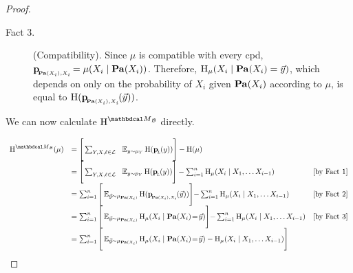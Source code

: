 \begin{proof}
\begin{description}
\item[Fact 3.] (Compatibility). Since $\mu$ is
					  compatible with every cpd,
					  $\bp[\Pa(X_i),X_i] = \mu(X_i \mid
					  \Pa(X_i))$. Therefore, $\H_\mu(X_i \mid
					  \Pa(X_i) = \vec y) $, which depends on only
					  on the probability of $X_i$ given $\Pa(X_i)$
					  according to $\mu$, is equal to
					  $\H(\bp[\Pa(X_i),X_i](\vec y))$.  
	\end{description}
					We can now calculate $\H^{\PDGof{\cal B}}$ directly.
	
	

\begin{equation}\label{eqn:maxentsum} 
			\begin{array}{lll}
		\H^{\PDGof{\mathcal B}}(\mu) &=
					\Bigg[\sum_{Y,X, \ell \in \cal L} ~~\E_{y \sim
						\mu_Y}  \H (\bp (y)) \Bigg] - \H(\mu) \\ 
		&= {\Bigg[\sum_{Y,X, \ell \in \cal L} ~~\E_{y
						  \sim p_Y}  \H (\bp (y)) \Bigg]} -
					\sum_{i = 1}^n \H_\mu(X_i \mid X_1, \ldots
											X_{i-1}) & \text{[by
												Fact 1]} \\  
		&= \sum_{i = 1}^n  \Bigg[ \E_{\vec y \sim
												\mu_{\Pa(X_i)}} \H
											  (\bp[\Pa(X_i), X_i]
											  (\vec y)) \Bigg] { -
											  \sum_{i = 1}^n
											  \H_\mu(X_i \mid X_1,
											  \ldots X_{i-1})} &
											\text{[by Fact 2]} \\ 
								&= \sum_{i = 1}^n  \Bigg[ \E_{\vec y \sim \mu_{\Pa(X_i)}}  \H_\mu (X_i \mid \Pa(X_i) \!=\! \vec y) \Bigg] 
		{ - \sum_{i = 1}^n \H_\mu(X_i \mid X_1, \ldots
					  X_{i-1})} & \text{[by Fact 3]} \\ 
		  &= \sum_{i = 1}^n  \Bigg[ \E_{\vec y \sim
						\mu_{\Pa(X_i)}} \H_\mu (X_i \mid \Pa(X_i)
					  \!=\! \vec y)  - \H_\mu(X_i \mid X_1, \ldots
					  X_{i-1}) \Bigg]  \\

\end{array}
\end{equation}
\end{proof}
